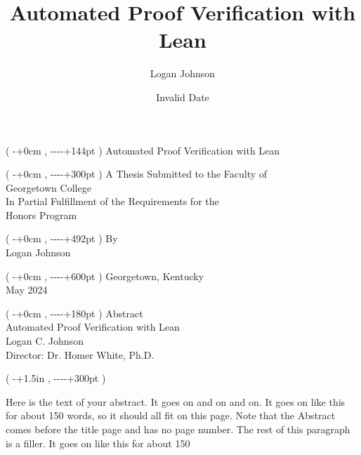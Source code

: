 \documentclass[
  letterpaper,
]{scrreprt}
\title{Automated Proof Verification with Lean}
\author{Logan Johnson}
\date{Invalid Date}
\theoremstyle{remark}
\begin{document}
\newcommand{\fromtop}[1]{%
  \dimexpr-1in-\topskip-\topmargin-\headheight-\headsep+#1\relax
}
\newcommand{\fromleft}[1]{%
  \dimexpr-1in-\oddsidemargin+#1\relax
}
\setlength{\textwidth}{6in}
\begin{titlepage}
\cleardoublepage
\thispagestyle{empty}
\begin{textblock*}{\paperwidth}(\fromleft{0cm},\fromtop{144pt})
\centering
Automated Proof Verification with Lean
\end{textblock*}
\begin{textblock*}{\paperwidth}(\fromleft{0cm},\fromtop{300pt})
\centering
A Thesis Submitted to the Faculty of\\
\vspace{12pt}
Georgetown College\\
\vspace{12pt}
In Partial Fulfillment of the Requirements for the\\
\vspace{12pt}
Honors Program
\end{textblock*}
\begin{textblock*}{\paperwidth}(\fromleft{0cm},\fromtop{492pt})
\centering
By\\
\vspace{12pt}
Logan Johnson
\end{textblock*}
\begin{textblock*}{\paperwidth}(\fromleft{0cm},\fromtop{600pt})
\centering
Georgetown, Kentucky\\
\vspace{12pt}
May 2024
\end{textblock*}
\pagebreak
\thispagestyle{empty}
\begin{textblock*}{\paperwidth}(\fromleft{0cm},\fromtop{180pt})
\centering
Abstract\\
\vspace{12pt}
Automated Proof Verification with Lean\\
\vspace{12pt}
Logan C. Johnson\\
\vspace{12pt}
Director: Dr. Homer White, Ph.D.
\end{textblock*}
\begin{textblock*}{\textwidth}(\fromleft{1.5in},\fromtop{300pt})
\raggedright
Here is the text of your abstract. It goes on and on and on. It goes on like this for about
150 words, so it should all fit on this page. Note that the Abstract comes before the title page and
has no page number. The rest of this paragraph is a filler. It goes on like this for about 150

\end{textblock*}
\end{titlepage}
\end{document}
